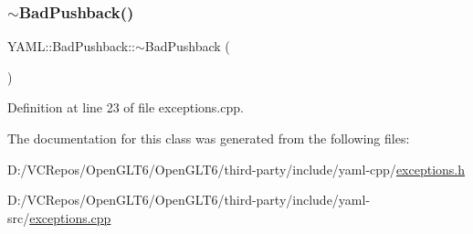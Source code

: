 \subsubsection{\texorpdfstring{$\sim$BadPushback()}{~BadPushback()}}
{\footnotesize\ttfamily Y\+A\+M\+L\+::\+Bad\+Pushback\+::$\sim$\+Bad\+Pushback (\begin{DoxyParamCaption}{ }\end{DoxyParamCaption})\hspace{0.3cm}{\ttfamily [virtual]}}



Definition at line 23 of file exceptions.\+cpp.



The documentation for this class was generated from the following files\+:\begin{DoxyCompactItemize}
\item 
D\+:/\+V\+C\+Repos/\+Open\+G\+L\+T6/\+Open\+G\+L\+T6/third-\/party/include/yaml-\/cpp/\mbox{\hyperlink{exceptions_8h}{exceptions.\+h}}\item 
D\+:/\+V\+C\+Repos/\+Open\+G\+L\+T6/\+Open\+G\+L\+T6/third-\/party/include/yaml-\/src/\mbox{\hyperlink{exceptions_8cpp}{exceptions.\+cpp}}\end{DoxyCompactItemize}
